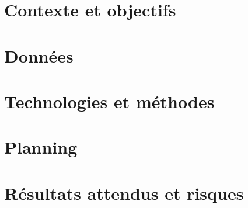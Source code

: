 \documentclass[11pt,a4paper]{report}
\newcommand*{\useportrait}{%
  \clearpage
  \KOMAoptions{paper=portrait,DIV=current}%
    \newgeometry{%
    left=2cm, right=2cm, top=2cm, bottom=2cm, headsep=1mm,
    }%
  \fancyhfoffset{0pt}%
}
\newcommand*{\uselandscape}{%
  \clearpage
  \KOMAoptions{paper=landscape,DIV=current}%
    \newgeometry{%
        left=2cm, right=2cm, top=3cm, bottom=0.5cm, includefoot
    }%
  \fancyhfoffset{0pt}%
}
\begin{document}

\tableofcontents
\newpage


\listoffigures
\newpage


\chapter{Contexte et objectifs}

\newpage

\chapter{Données}

\newpage

\chapter{Technologies et méthodes}

\vspace{10mm}
\newpage

  \chapter{Planning}
  
\newpage

\chapter{Résultats attendus et risques}

\newpage

%
%
\end{document}
